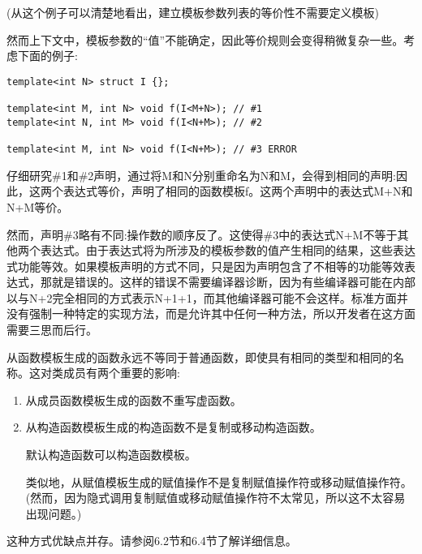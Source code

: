 (从这个例子可以清楚地看出，建立模板参数列表的等价性不需要定义模板)

然而上下文中，模板参数的“值”不能确定，因此等价规则会变得稍微复杂一些。考虑下面的例子:

\begin{lstlisting}[style=styleCXX]
template<int N> struct I {};

template<int M, int N> void f(I<M+N>); // #1
template<int N, int M> void f(I<N+M>); // #2

template<int M, int N> void f(I<N+M>); // #3 ERROR
\end{lstlisting}

仔细研究\#1和\#2声明，通过将M和N分别重命名为N和M，会得到相同的声明:因此，这两个表达式等价，声明了相同的函数模板f。这两个声明中的表达式M+N和N+M等价。

然而，声明\#3略有不同:操作数的顺序反了。这使得\#3中的表达式N+M不等于其他两个表达式。由于表达式将为所涉及的模板参数的值产生相同的结果，这些表达式功能等效。如果模板声明的方式不同，只是因为声明包含了不相等的功能等效表达式，那就是错误的。这样的错误不需要编译器诊断，因为有些编译器可能在内部以与N+2完全相同的方式表示N+1+1，而其他编译器可能不会这样。标准方面并没有强制一种特定的实现方法，而是允许其中任何一种方法，所以开发者在这方面需要三思而后行。

从函数模板生成的函数永远不等同于普通函数，即使具有相同的类型和相同的名称。这对类成员有两个重要的影响:

\begin{enumerate}
\item
从成员函数模板生成的函数不重写虚函数。

\item
从构造函数模板生成的构造函数不是复制或移动构造函数。

\begin{tcolorbox}[colback=webgreen!5!white,colframe=webgreen!75!black]
\hspace*{0.75cm}默认构造函数可以构造函数模板。
\end{tcolorbox}

类似地，从赋值模板生成的赋值操作不是复制赋值操作符或移动赋值操作符。(然而，因为隐式调用复制赋值或移动赋值操作符不太常见，所以这不太容易出现问题。)
\end{enumerate}

这种方式优缺点并存。请参阅6.2节和6.4节了解详细信息。











